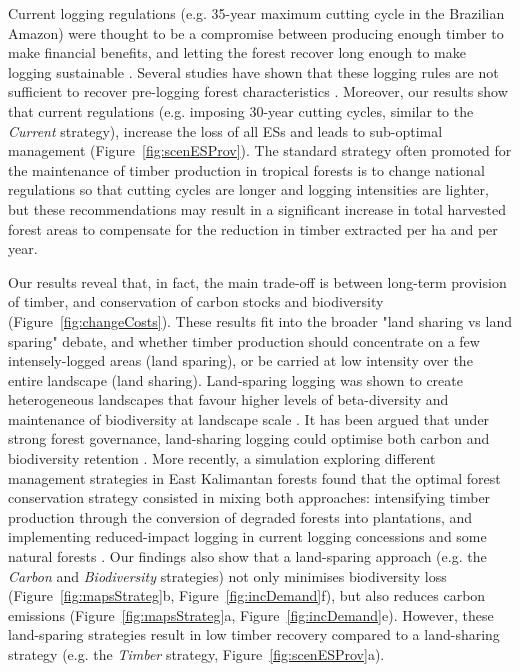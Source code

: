 \documentclass[12pt]{article}
\begin{document}
Current logging regulations (e.g. 35-year maximum cutting cycle in the Brazilian Amazon) were thought to be a compromise between producing enough timber to make financial benefits, and letting the forest recover long enough to make logging sustainable \cite{Seydack2012}. Several studies have shown that these logging rules are not sufficient to recover pre-logging forest characteristics \cite{Sist2007,Zimmerman2012,Piponiot2018}. Moreover, our results show that current regulations (e.g. imposing 30-year cutting cycles, similar to the \textit{Current} strategy), increase the loss of all ESs and leads to sub-optimal management (Figure~\ref{fig:scenESProv}). The standard strategy often promoted for the maintenance of timber production in tropical forests is to change national regulations so that cutting cycles are longer and logging intensities are lighter, but these recommendations may result in a significant increase in total harvested forest areas to compensate for the reduction in timber extracted per ha and per year.

Our results reveal that, in fact, the main trade-off is between long-term provision of timber, and conservation of carbon stocks and biodiversity (Figure~\ref{fig:changeCosts}). These results fit into the broader "land sharing vs land sparing" debate, and whether timber production should concentrate on a few intensely-logged areas (land sparing), or be carried at low intensity over the entire landscape (land sharing). Land-sparing logging was shown to create heterogeneous landscapes that favour higher levels of beta-diversity and maintenance of biodiversity at landscape scale \cite{DeCastroSolar2015,Edwards2014}. It has been argued that under strong forest governance, land-sharing logging could optimise both carbon and biodiversity retention \cite{Griscom2018}. More recently, a simulation exploring different management strategies in East Kalimantan forests found that the optimal forest conservation strategy consisted in mixing both approaches: intensifying timber production through the conversion of degraded forests into plantations, and implementing reduced-impact logging in current logging concessions and some natural forests \cite{Runting2018}. Our findings also show that a land-sparing approach (e.g. the \textit{Carbon} and \textit{Biodiversity} strategies) not only minimises biodiversity loss (Figure~\ref{fig:mapsStrateg}b, Figure~\ref{fig:incDemand}f), but also reduces carbon emissions (Figure~\ref{fig:mapsStrateg}a, Figure~\ref{fig:incDemand}e). However, these land-sparing strategies result in low timber recovery compared to a land-sharing strategy (e.g. the \textit{Timber} strategy, Figure~\ref{fig:scenESProv}a).
\end{document}
